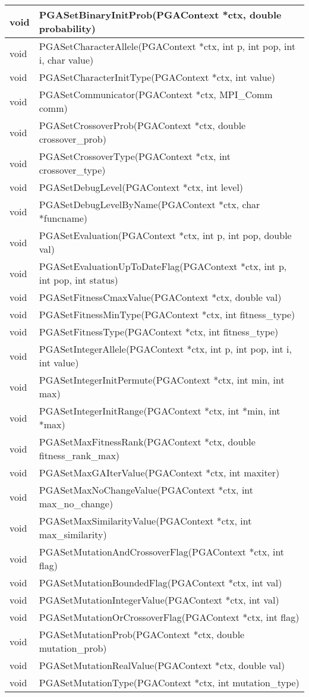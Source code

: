 \documentclass{report}
\begin{document}
\begin{tabular}{|l|l|}
\hline
void &  PGASetBinaryInitProb(PGAContext *ctx, double probability) \\ \hline
void &  PGASetCharacterAllele(PGAContext *ctx, int p, int pop, int i, char
value) \\ \hline
void &  PGASetCharacterInitType(PGAContext *ctx, int value) \\ \hline
void &  PGASetCommunicator(PGAContext *ctx, MPI\_Comm comm) \\ \hline
void &  PGASetCrossoverProb(PGAContext *ctx, double crossover\_prob) \\ \hline
void &  PGASetCrossoverType(PGAContext *ctx, int crossover\_type) \\ \hline
void &  PGASetDebugLevel(PGAContext *ctx, int level) \\ \hline
void &  PGASetDebugLevelByName(PGAContext *ctx, char *funcname) \\ \hline
void &  PGASetEvaluation(PGAContext *ctx, int p, int pop, double val) \\ \hline
void &  PGASetEvaluationUpToDateFlag(PGAContext *ctx, int p, int pop, int
status) \\ \hline
void &  PGASetFitnessCmaxValue(PGAContext *ctx, double val) \\ \hline
void &  PGASetFitnessMinType(PGAContext *ctx, int fitness\_type) \\ \hline
void &  PGASetFitnessType(PGAContext *ctx, int fitness\_type) \\ \hline
void &  PGASetIntegerAllele(PGAContext *ctx, int p, int pop, int i, int value)
\\ \hline
void &  PGASetIntegerInitPermute(PGAContext *ctx, int min, int max) \\ \hline
void &  PGASetIntegerInitRange(PGAContext *ctx, int *min, int *max) \\ \hline
void &  PGASetMaxFitnessRank(PGAContext *ctx, double fitness\_rank\_max) \\ \hline
void &  PGASetMaxGAIterValue(PGAContext *ctx, int maxiter) \\ \hline
void &  PGASetMaxNoChangeValue(PGAContext *ctx, int max\_no\_change) \\ \hline
void &  PGASetMaxSimilarityValue(PGAContext *ctx, int max\_similarity) \\ \hline
void &  PGASetMutationAndCrossoverFlag(PGAContext *ctx, int flag) \\ \hline
void &  PGASetMutationBoundedFlag(PGAContext *ctx, int val) \\ \hline
void &  PGASetMutationIntegerValue(PGAContext *ctx, int val) \\ \hline
void &  PGASetMutationOrCrossoverFlag(PGAContext *ctx, int flag) \\ \hline
void &  PGASetMutationProb(PGAContext *ctx, double mutation\_prob) \\ \hline
void &  PGASetMutationRealValue(PGAContext *ctx, double val) \\ \hline
void &  PGASetMutationType(PGAContext *ctx, int mutation\_type) \\ \hline
\end{tabular}
\end{document}
